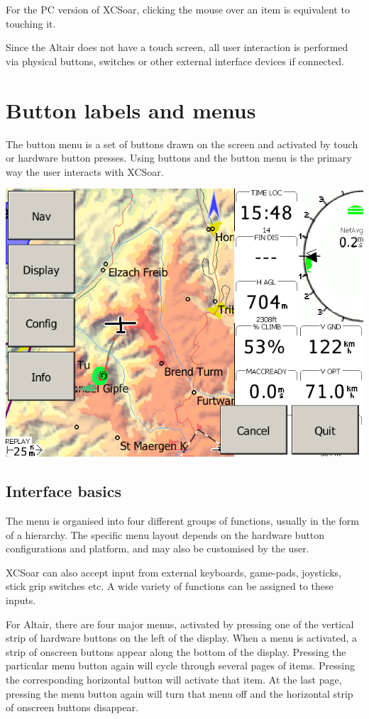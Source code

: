 \documentclass[a4paper,12pt]{refrep}
\begin{document}
For the PC version of XCSoar, clicking the mouse over an item is equivalent to
touching it.

Since the Altair does not have a touch screen, all user interaction is performed
via physical buttons, switches or other external interface devices if connected.

\section{Button labels and menus}
The button menu is a set of buttons drawn on the screen and activated by touch
or hardware button presses.  Using buttons and the button menu is the primary
way the user interacts with XCSoar.

\begin{center}
\includegraphics[angle=0,width=\linewidth,keepaspectratio='true']{figures/buttonmenu.png}
\end{center}

\subsection*{Interface basics}
The menu is organised into four different groups of functions, usually in
the form of a hierarchy.  The specific menu layout depends on the
hardware button configurations and platform, and may also be customised by the
user.

XCSoar can also accept input from external keyboards, game-pads, joysticks,
stick grip switches etc. A wide variety of functions can be assigned to these
inputs.

For Altair, there are four major menus, activated by pressing one of
the vertical strip of hardware buttons on the left of the display.
When a menu is activated, a strip of onscreen buttons appear along the 
bottom of the display.  Pressing the particular menu button again will
cycle through several pages of items.  Pressing the corresponding
horizontal button will activate that item.  At the last page, pressing
the menu button again will turn that menu off and the horizontal strip
of onscreen buttons disappear.  
\end{document}

